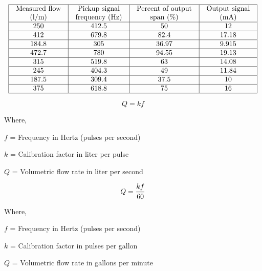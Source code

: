 






$$\vbox{\offinterlineskip
\halign{\strut
\vrule \quad\hfil # \ \hfil & 
\vrule \quad\hfil # \ \hfil & 
\vrule \quad\hfil # \ \hfil & 
\vrule \quad\hfil # \ \hfil \vrule \cr
\noalign{\hrule}
%
Measured flow & Pickup signal & Percent of output & Output signal \cr
%
(l/m) & frequency (Hz) & span (\%) & (mA) \cr
%
\noalign{\hrule}
%
250 & 412.5 & 50 & 12 \cr
%
\noalign{\hrule}
%
412 & 679.8 & 82.4 & 17.18 \cr
%
\noalign{\hrule}
%
184.8 & 305 & 36.97 & 9.915 \cr
%
\noalign{\hrule}
%
472.7 & 780 & 94.55 & 19.13 \cr
%
\noalign{\hrule}
%
315 & 519.8 & 63 & 14.08 \cr
%
\noalign{\hrule}
%
245 & 404.3 & 49 & 11.84 \cr
%
\noalign{\hrule}
%
187.5 & 309.4 & 37.5 & 10 \cr
%
\noalign{\hrule}
%
375 & 618.8 & 75 & 16 \cr
%
\noalign{\hrule}
} %
}$$ %

$$Q = kf$$

\noindent
Where,

$f$ = Frequency in Hertz (pulses per second)

$k$ = Calibration factor in liter per pulse

$Q$ = Volumetric flow rate in liter per second

\vskip 10pt

$$Q = {kf \over 60}$$

\noindent
Where,

$f$ = Frequency in Hertz (pulses per second)

$k$ = Calibration factor in pulses per gallon

$Q$ = Volumetric flow rate in gallons per minute












